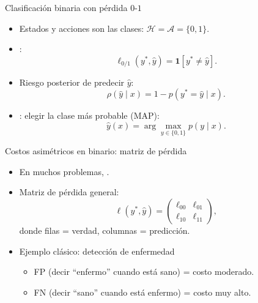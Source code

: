\begin{frame}{Clasificación binaria con pérdida \(0\text{-}1\)}
\begin{itemize}
  \item Estados y acciones son las clases: \(\mathcal{H}=\mathcal{A}=\{0,1\}\). \hfill {}
  \item {}:
  \[
    \ell_{0/1}(y^*,\hat{y}) = \mathbf{1}[y^*\neq \hat{y}].
  \]
  \item Riesgo posterior de predecir \(\hat{y}\):
  \[
    \rho(\hat{y}\mid x) = 1 - p(y^*=\hat{y}\mid x).
  \]
  \item {}: elegir la clase más probable (MAP):
  \[
    \hat{y}(x) = \arg\max_{y\in\{0,1\}} p(y\mid x).
  \]
\end{itemize}
\end{frame}

\begin{frame}{Costos asimétricos en binario: matriz de pérdida}
\small
\begin{itemize}
  \item En muchos problemas, .
  \item Matriz de pérdida general:
  \[
  \ell(y^*,\hat{y}) =
  \begin{pmatrix}
    \ell_{00} & \ell_{01} \\
    \ell_{10} & \ell_{11}
  \end{pmatrix},
  \]
  donde filas = verdad, columnas = predicción. \hfill {}
  \item Ejemplo clásico: detección de enfermedad
  \begin{itemize}
    \item FP (decir “enfermo” cuando está sano) = costo moderado.
    \item FN (decir “sano” cuando está enfermo) = costo muy alto.
  \end{itemize}
\end{itemize}
\end{frame}

